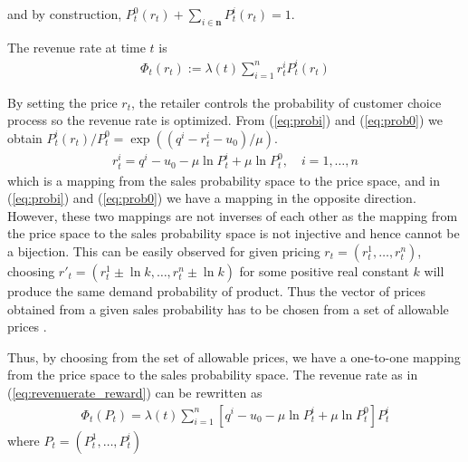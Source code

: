 and by construction, $P_t^0(r_t) + \sum_{i \in \mathbf{n}}P_t^i(r_t) = 1$.

The revenue rate at time $t$ is 
\begin{align}
\Phi_t(r_t):=\lambda(t) \sum_{i=1}^{n}r_t^iP_t^i(r_t) \label{eq:revenuerate_reward}
\end{align}

By setting the price $r_t$, the retailer controls the probability of customer choice process so the revenue rate is optimized. From (\ref{eq:probi}) and (\ref{eq:prob0}) we obtain $P_t^i(r_t)/P_t^0=\exp ((q^i-r_t^i-u_0)/\mu)$.
\begin{align}
r_t^i=q^i-u_0-\mu \ln P_t^i + \mu \ln P_t^0, \quad i=1,\ldots, n \label{eq:pricetoprob}
\end{align}
which is a mapping from the sales probability space to the price space, and in (\ref{eq:probi}) and (\ref{eq:prob0}) we have a mapping in the opposite direction. However, these two mappings are not inverses of each other as the mapping from the price space to the sales probability space is not injective and hence cannot be a bijection. This can be easily observed for given pricing $r_t = (r_t^1,\ldots,r_t^n)$, choosing $r'_t = (r_t^1\pm\ln k,\ldots,r_t^n\pm \ln k)$ for some positive real constant $k$ will produce the same demand probability of product. Thus the vector of prices obtained from a given sales probability has to be chosen from a set of allowable prices  \cite{Gallego1997}.


Thus, by choosing from the set of allowable prices, we have a one-to-one mapping from the price space to the sales probability space. The revenue rate as in (\ref{eq:revenuerate_reward}) can be rewritten as 
\begin{align}
\Phi_t(P_t) = \lambda(t)\sum_{i=1}^{n}\left[q^i-u_0-\mu \ln P_t^i + \mu \ln P_t^0 \right]P_t^i\label{eq:revenuerate_prob}
\end{align}
where $P_t = (P_t^1,\ldots, P_t^i)$


